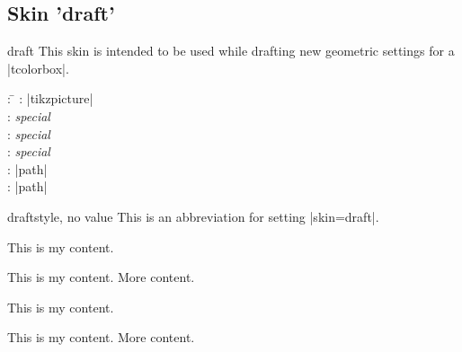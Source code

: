 \clearpage

\subsection{Skin 'draft'}\label{subsec:draft}

\begin{docSkin}{draft}
  This skin is intended to be used while drafting new geometric settings
  for a |tcolorbox|.
\begin{tcolorbox}[skintable=draft]
  \begin{tabbing}
    : \=\kill
    :  \> |tikzpicture|\\ 
    :           \> \emph{special}\\
    : \> \emph{special}\\ 
    :        \> \emph{special}\\
    :    \> |path|\\
    :           \> |path|
  \end{tabbing}
\end{tcolorbox}
\end{docSkin}

\begin{docTcbKey}{draft}{}{style, no value}
  This is an abbreviation for setting |skin=draft|.
\end{docTcbKey}


\begin{dispExample}
\begin{tcbraster}[draft,raster equal height,raster columns=4,
    colback=LightGreen,colframe=DarkGreen,colbacktitle=LimeGreen!75!DarkGreen,
    left=1mm,right=1mm,top=1mm,bottom=1mm,middle=1mm]
  \begin{tcolorbox}
    This is my content.
  \end{tcolorbox}
  \begin{tcolorbox}
    This is my content.
    \tcblower
    More content.
  \end{tcolorbox}
  \begin{tcolorbox}[adjusted title=My title]
    This is my content.
  \end{tcolorbox}
  \begin{tcolorbox}[adjusted title=My title]
    This is my content.
    \tcblower
    More content.
  \end{tcolorbox}
\end{tcbraster}
\end{dispExample}


